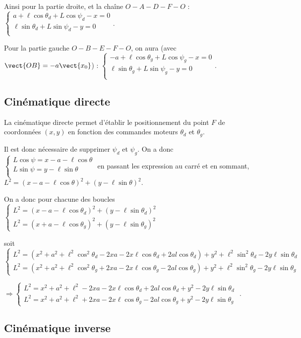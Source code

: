 \documentclass[10pt,fleqn]{article} %
\begin{document}
Ainsi pour la partie droite, et la chaîne $O - A - D - F - O$ :
$
\left\{
\begin{array}{l}
a+ \ell  \cos\theta_d +L \cos\psi_d   -x  = 0 \\
\ell   \sin\theta_d +L\sin\psi_d  -y = 0 \\
\end{array}
\right.
$.

Pour la partie gauche $O - B- E- F - O$, on aura (avec $\vect{OB}=-a\vect{x_0}$) : 
$
\left\{
\begin{array}{l}
-a+ \ell  \cos\theta_g +L \cos\psi_g   -x  = 0 \\
\ell   \sin\theta_g +L\sin\psi_g  -y = 0 \\
\end{array}
\right.
$.

\subsection{Cinématique directe}
La cinématique directe permet d'établir le positionnement du point $F$ de coordonnées $(x,y)$ en fonction des commandes moteurs $\theta_d$ et $\theta_g$. 

Il est donc nécessaire de supprimer $\psi_d$ et $\psi_g$. On a donc
$
\left\{
\begin{array}{l}
L \cos\psi   = x  -a- \ell  \cos\theta  \\
L\sin\psi = y - \ell   \sin\theta \\
\end{array}
\right.
$ 
en passant les expression au carré et en sommant, 
 $L^2 = \left(x  -a- \ell  \cos\theta \right)^2 + \left( y - \ell   \sin\theta \right)^2$.

On a donc pour chacune des boucles 
$
\left\{
\begin{array}{l}
L^2 = \left(x  -a- \ell  \cos\theta_d \right)^2 + \left( y - \ell   \sin\theta_d \right)^2 \\
L^2 = \left(x  +a- \ell  \cos\theta_g \right)^2 + \left( y - \ell   \sin\theta_g \right)^2
\end{array}
\right.
$ 

soit 
$
\left\{
\begin{array}{l}
L^2 = \left(x^2  +a^2+\ell^2  \cos^2\theta_d  -2xa -2x\ell\cos\theta_d+2al\cos\theta_d  \right) +  y^2 + \ell^2   \sin^2\theta_d- 2y \ell   \sin\theta_d  \\
L^2 = \left(x^2  +a^2+\ell^2  \cos^2\theta_g  +2xa -2x\ell\cos\theta_g-2al\cos\theta_g \right) +  y^2 + \ell^2   \sin^2\theta_g -2y  \ell   \sin\theta_g 
\end{array}
\right.
$ 

$
\Rightarrow
\left\{
\begin{array}{l}
L^2 = x^2  +a^2+\ell^2  -2xa -2x\ell\cos\theta_d+2al\cos\theta_d  +  y^2 - 2y \ell   \sin\theta_d  \\
L^2 = x^2  +a^2+\ell^2 +2xa -2x\ell\cos\theta_g-2al\cos\theta_g  +  y^2  -2y  \ell   \sin\theta_g 
\end{array}
\right.
$ 
.
\subsection{Cinématique inverse}
\end{document}
